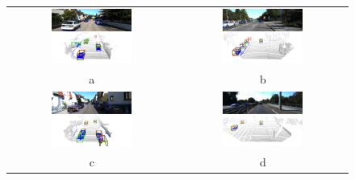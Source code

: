 \begin{figure}
    \centering
    \begin{tabular}{c c}
        
            \includegraphics[width=0.5\textwidth]{figures/Qualitative_examples/36.png}
            & 
            \includegraphics[width=0.5\textwidth]{figures/Qualitative_examples/52.png}
            \\
            a & b\\
            \includegraphics[width=0.5\textwidth]{figures/Qualitative_examples/58.png}
            &  
            \includegraphics[width=0.5\textwidth]{figures/Qualitative_examples/172.png}
            \\
            c & d\\
        

\end{tabular}
\end{figure}
